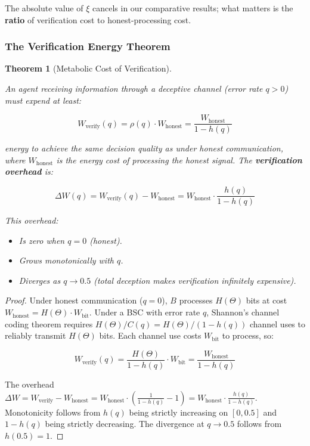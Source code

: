 \documentclass[11pt]{article}
\theoremstyle{plain}
\newtheorem{theorem}{Theorem}
\theoremstyle{definition}
\theoremstyle{remark}
\let\origsubsubsection\subsubsection
\renewcommand{\subsubsection}{\needspace{4\baselineskip}\origsubsubsection}
\begin{document}
The absolute value of \(\xi\) cancels in our comparative results; what
matters is the \textbf{ratio} of verification cost to honest-processing
cost.

\subsubsection{The Verification Energy
Theorem}\label{the-verification-energy-theorem}

\begin{theorem}[Metabolic Cost of Verification]
\label{thm-metabolic-cost-verification}

An agent receiving information through a deceptive channel (error rate $q > 0$) must expend at least:

$$W_{\text{verify}}(q) = \rho(q) \cdot W_{\text{honest}} = \frac{W_{\text{honest}}}{1 - h(q)}$$

energy to achieve the same decision quality as under honest communication, where $W_{\text{honest}}$ is the energy cost of processing the honest signal. The \textbf{verification overhead} is:

$$\Delta W(q) = W_{\text{verify}}(q) - W_{\text{honest}} = W_{\text{honest}} \cdot \frac{h(q)}{1 - h(q)}$$

This overhead:
\begin{itemize}
\item Is zero when $q = 0$ (honest).
\item Grows monotonically with $q$.
\item Diverges as $q \to 0.5$ (total deception makes verification infinitely expensive).
\end{itemize}

\end{theorem}

\begin{proof}
Under honest communication ($q = 0$), $B$ processes $H(\Theta)$ bits at cost $W_{\text{honest}} = H(\Theta) \cdot W_{\text{bit}}$. Under a BSC with error rate $q$, Shannon's channel coding theorem requires $H(\Theta) / C(q) = H(\Theta) / (1 - h(q))$ channel uses to reliably transmit $H(\Theta)$ bits. Each channel use costs $W_{\text{bit}}$ to process, so:

$$W_{\text{verify}}(q) = \frac{H(\Theta)}{1 - h(q)} \cdot W_{\text{bit}} = \frac{W_{\text{honest}}}{1 - h(q)}$$

The overhead $\Delta W = W_{\text{verify}} - W_{\text{honest}} = W_{\text{honest}} \cdot \left(\frac{1}{1-h(q)} - 1\right) = W_{\text{honest}} \cdot \frac{h(q)}{1-h(q)}$. Monotonicity follows from $h(q)$ being strictly increasing on $[0, 0.5]$ and $1 - h(q)$ being strictly decreasing. The divergence at $q \to 0.5$ follows from $h(0.5) = 1$.
\end{proof}
\end{document}
